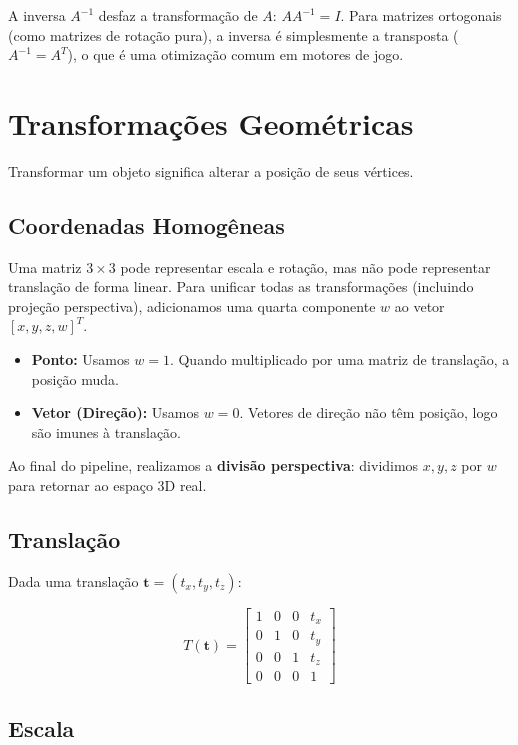 A inversa $A^{-1}$ desfaz a transformação de $A$: $AA^{-1} = I$. Para matrizes ortogonais (como matrizes de rotação pura), a inversa é simplesmente a transposta ($A^{-1} = A^T$), o que é uma otimização comum em motores de jogo.

\section{Transformações Geométricas}

Transformar um objeto significa alterar a posição de seus vértices.

\subsection{Coordenadas Homogêneas}

Uma matriz $3 \times 3$ pode representar escala e rotação, mas não pode representar translação de forma linear. Para unificar todas as transformações (incluindo projeção perspectiva), adicionamos uma quarta componente $w$ ao vetor $[x, y, z, w]^T$.

\begin{itemize}
    \item \textbf{Ponto:} Usamos $w=1$. Quando multiplicado por uma matriz de translação, a posição muda.
    \item \textbf{Vetor (Direção):} Usamos $w=0$. Vetores de direção não têm posição, logo são imunes à translação.
\end{itemize}

Ao final do pipeline, realizamos a \textbf{divisão perspectiva}: dividimos $x, y, z$ por $w$ para retornar ao espaço 3D real.

\subsection{Translação}

Dada uma translação $\mathbf{t} = (t_x, t_y, t_z)$:

\begin{equation}
    T(\mathbf{t}) = \begin{bmatrix}
    1 & 0 & 0 & t_x \\
    0 & 1 & 0 & t_y \\
    0 & 0 & 1 & t_z \\
    0 & 0 & 0 & 1
    \end{bmatrix}
\end{equation}

\subsection{Escala}

